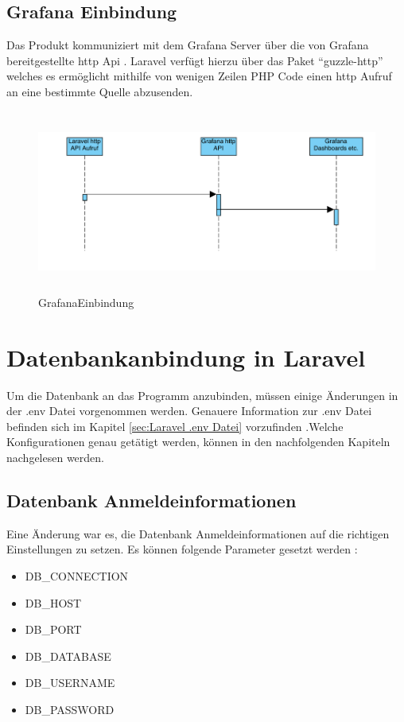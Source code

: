 \subsection{Grafana Einbindung}
Das Produkt kommuniziert mit dem Grafana Server über die von Grafana bereitgestellte http Api . Laravel verfügt hierzu über das Paket “guzzle-http” welches es ermöglicht mithilfe von wenigen Zeilen PHP Code einen http Aufruf an eine bestimmte Quelle abzusenden.
\begin{figure}[h]
	\centering
	\includegraphics[height=6cm,width=18cm]{images/GrafanaEinbindung}
	\caption{GrafanaEinbindung}
	\label{fig:GrafanaEinbindung}
\end{figure}





\section{Datenbankanbindung in Laravel}
Um die Datenbank an das Programm anzubinden, müssen einige Änderungen in der .env Datei vorgenommen werden. Genauere Information zur .env Datei befinden sich im Kapitel \ref{sec:Laravel .env Datei} vorzufinden .Welche Konfigurationen genau getätigt werden, können in den nachfolgenden Kapiteln nachgelesen werden. 

\subsection{Datenbank Anmeldeinformationen}
Eine Änderung war es, die Datenbank Anmeldeinformationen auf die richtigen Einstellungen zu setzen. Es können folgende Parameter gesetzt werden : 
\begin{itemize}
	\item DB\_CONNECTION
	\item DB\_HOST
	\item DB\_PORT
	\item DB\_DATABASE
	\item DB\_USERNAME
	\item DB\_PASSWORD
\end{itemize}

